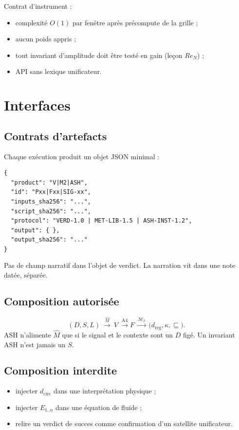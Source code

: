\documentclass[11pt,a4paper]{article}
\newcommand{\Mhat}{\hat{M}}
\newcommand{\Mtwo}{\mathcal{M}_{2}}
\theoremstyle{definition}
\begin{document}
Contrat d'instrument :
\begin{itemize}
  \item complexité \(O(1)\) par fenêtre après précompute de la grille ;
  \item aucun poids appris ;
  \item tout invariant d'amplitude doit être testé en gain (leçon \(Re_N\)) ;
  \item API sans lexique unificateur.
\end{itemize}

\section{Interfaces}

\subsection{Contrats d'artefacts}
Chaque exécution produit un objet JSON minimal :
\begin{verbatim}
{
  "product": "V|M2|ASH",
  "id": "Pxx|Fxx|SIG-xx",
  "inputs_sha256": "...",
  "script_sha256": "...",
  "protocol": "VERD-1.0 | MET-LIB-1.5 | ASH-INST-1.2",
  "output": { },
  "output_sha256": "..."
}
\end{verbatim}
Pas de champ narratif dans l'objet de verdict. La narration vit dans une note datée, séparée.

\subsection{Composition autorisée}
\[
(D,S,L)
\ \xrightarrow{\Mhat}\
V
\ \xrightarrow{\mathrm{A4}}
F
\ \xrightarrow{\Mtwo}\
\bigl(d_{\mathrm{reg}},\kappa,\sqsubseteq\bigr).
\]
ASH n'alimente \(\Mhat\) que si le signal et le contexte sont un \(D\) figé. Un invariant ASH n'est jamais un \(S\).

\subsection{Composition interdite}
\begin{itemize}
  \item injecter \(d_{\mathrm{circ}}\) dans une interprétation physique ;
  \item injecter \(E_{1..n}\) dans une équation de fluide ;
  \item relire un verdict de succes comme confirmation d'un satellite unificateur.
\end{itemize}
\end{document}
